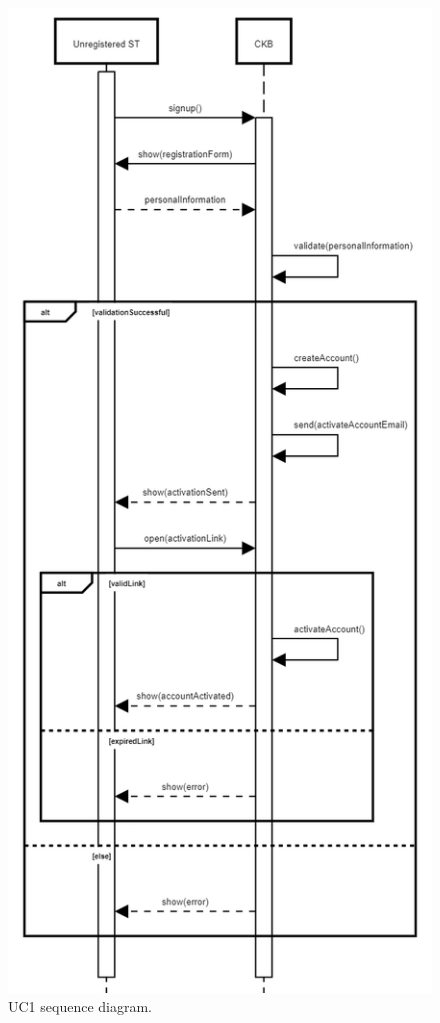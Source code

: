 \begin{center}
  \begin{figure} [H]
    \begin{center}
        \includegraphics[width=\textwidth,height=\textheight,keepaspectratio]{Images/SequenceDiagrams/UC1.png}
        \caption{UC1 sequence diagram.}
        \label{fig: UC1_sequence_diagram}
    \end{center}
  \end{figure}
\end{center}

